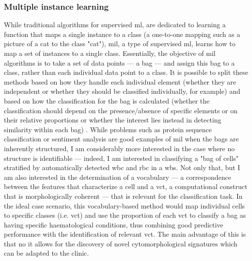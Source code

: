\begin{figure}[!ht]
    \label{fig:u-map-condition-density}
\end{figure}

\subsubsection{Multiple instance learning}

While traditional algorithms for supervised \ac{ml}, are dedicated to learning a function that maps a single instance to a class (a one-to-one mapping such as a picture of a cat to the class "cat"), \ac{mil}, a type of supervised \ac{ml}, learns how to map a set of instances to a single class. Essentially, the objective of \ac{mil} algorithms is to take a set of data points --- a bag --- and assign this bag to a class, rather than each individual data point to a class. It is possible to split these methods based on how they handle each individual element (whether they are independent or whether they should be classified individually, for example) and based on how the classification for the bag is calculated (whether the classification should depend on the presence/absence of specific elements or on their relative proportions or whether the interest lies instead in detecting similarity within each bag) \cite{Amores2013-ym,Carbonneau2016-xc}. While problems such as protein sequence classification or sentiment analysis are good examples of \ac{mil} when the bags are inherently structured, I am considerably more interested in the case where no structure is identifiable --- indeed, I am interested in classifying a "bag of cells" stratified by automatically detected \ac{wbc} and \ac{rbc} in a \ac{wbs}. Not only that, but I am also interested in the determination of a vocabulary --- a correspondence between the features that characterize a cell and a \ac{vct}, a computational construct that is morphologically coherent --- that is relevant for the classification task. In the ideal case scenario, this vocabulary-based method would map individual cells to specific classes (i.e. \ac{vct}) and use the proportion of each \ac{vct} to classify a bag as having specific haematological conditions, thus combining good predictive performance with the identification of relevant \ac{vct}. The main advantage of this is that no it allows for the discovery of novel cytomorphological signatures which can be adapted to the clinic.

